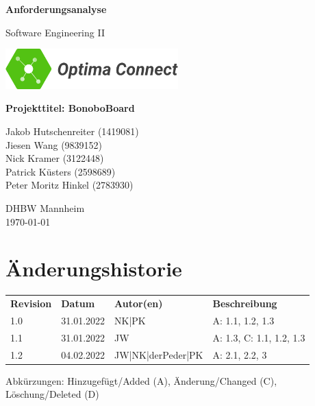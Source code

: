 \documentclass[a4paper,11pt]{scrartcl}
\begin{document}
\renewcommand*{\arraystretch}{1.2}
\begin{titlepage}
    \begin{center}
        \vspace*{1cm}\Huge
        \textbf{Anforderungsanalyse}\par                
        \vspace{0.5cm}\LARGE        
        Software Engineering II\par           
        \vspace{2cm}
        \includegraphics[width=0.5\textwidth]{OptimaLogo_long}\par   
        \vspace{1cm}
        \textbf{Projekttitel: BonoboBoard}\par        
        \vfill\Large   
        Jakob Hutschenreiter (1419081)\\Jiesen Wang (9839152)\\Nick Kramer (3122448)\\Patrick Küsters (2598689)\\Peter Moritz Hinkel (2783930)\par
        \vspace{2cm}
        DHBW Mannheim\\
        \today     
    \end{center}
\end{titlepage}

\section*{Änderungshistorie}
\begin{table}[h]
	\begin{tabular}{@{} p{20mm} p{25mm} p{40mm} p{75mm}}
		\textbf{Revision} & \textbf{Datum} & \textbf{Autor(en)} & \textbf{Beschreibung}\\
		1.0 & 31.01.2022 & NK|PK & A: 1.1, 1.2, 1.3\\
		1.1 & 31.01.2022 & JW & A: 1.3, C: 1.1, 1.2, 1.3\\
		1.2 & 04.02.2022 & JW|NK|derPeder|PK & A: 2.1, 2.2, 3 \\
	\end{tabular}
\end{table}
\noindent
Abkürzungen: Hinzugefügt/Added (A), Änderung/Changed (C), Löschung/Deleted (D)
\vspace{2cm}
\tableofcontents
\newpage
{}
\end{document}
